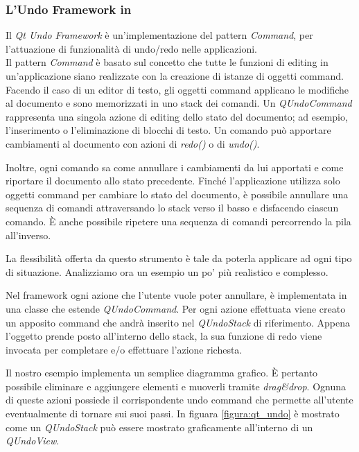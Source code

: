 \subsubsection*{L'Undo Framework in \qt{}}
Il \emph{Qt Undo Framework} è un'implementazione del pattern \emph{Command}\cite{AUPL04}, per l'attuazione di funzionalità di undo/redo nelle applicazioni.\\
Il pattern \emph{Command} è basato sul concetto che tutte le funzioni di editing in un'applicazione siano realizzate con la creazione di istanze di oggetti command. Facendo il caso di un editor di testo, gli oggetti command applicano le modifiche al documento e sono memorizzati in uno stack dei comandi. Un \emph{QUndoCommand} rappresenta una singola azione di editing dello stato del documento; ad esempio, l'inserimento o l'eliminazione di blocchi di testo. Un comando può apportare cambiamenti al documento con azioni di \emph{redo()} o di \emph{undo()}.

Inoltre, ogni comando sa come annullare i cambiamenti da lui apportati e come riportare il documento allo stato precedente. Finché l'applicazione utilizza solo oggetti command per cambiare lo stato del documento, è possibile annullare una sequenza di comandi attraversando lo stack verso il basso e disfacendo ciascun comando. È anche possibile ripetere una sequenza di comandi percorrendo la pila all'inverso.

La flessibilità offerta da questo strumento è tale da poterla applicare ad ogni tipo di situazione. Analizziamo ora un esempio un po' più realistico e complesso.

Nel framework ogni azione che l'utente vuole poter annullare, è implementata in una classe che estende \emph{QUndoCommand}. Per ogni azione effettuata viene creato un apposito command che andrà inserito nel \emph{QUndoStack} di riferimento. Appena l'oggetto prende posto all'interno dello stack, la sua funzione di redo viene invocata per completare e/o effettuare l'azione richesta.

Il nostro esempio implementa un semplice diagramma grafico. È pertanto possibile eliminare e aggiungere elementi e muoverli tramite \emph{drag\&{}drop}. Ognuna di queste azioni possiede il corrispondente undo command che permette all'utente eventualmente di tornare sui suoi passi.
In figuara \ref{figura:qt_undo} è mostrato come un \emph{QUndoStack} può essere mostrato graficamente all'interno di un \emph{QUndoView}.

